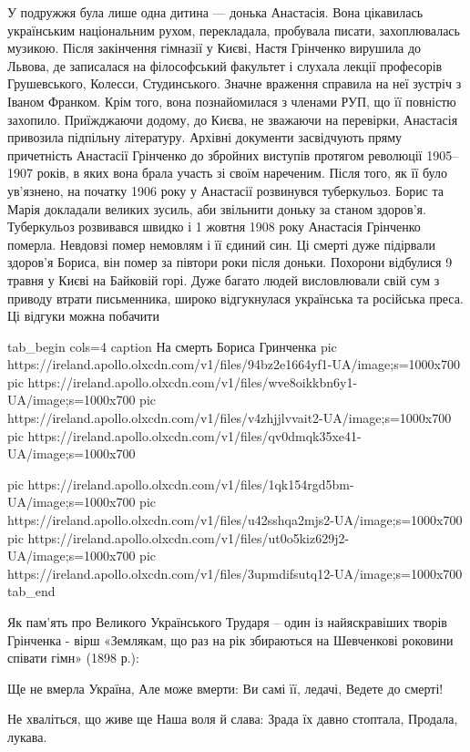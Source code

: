 У подружжя була лише одна дитина — донька Анастасія. Вона цікавилась
українським національним рухом, перекладала, пробувала писати, захоплювалась
музикою. Після закінчення гімназії у Києві, Настя Грінченко вирушила до Львова,
де записалася на філософський факультет і слухала лекції професорів
Грушевського, Колесси, Студинського. Значне враження справила на неї зустріч з
Іваном Франком. Крім того, вона познайомилася з членами РУП, що її повністю
захопило. Приїжджаючи додому, до Києва, не зважаючи на перевірки, Анастасія
привозила підпільну літературу. Архівні документи засвідчують пряму причетність
Анастасії Грінченко до збройних виступів протягом революції 1905–1907 років, в
яких вона брала участь зі своїм нареченим. Після того, як її було ув'язнено, на
початку 1906 року у Анастасії розвинувся туберкульоз. Борис та Марія докладали
великих зусиль, аби звільнити доньку за станом здоров'я. Туберкульоз розвивався
швидко і 1 жовтня 1908 року Анастасія Грінченко померла. Невдовзі помер
немовлям і її єдиний син. Ці смерті дуже підірвали здоров'я Бориса, він помер
за півтори роки після доньки. Похорони відбулися 9 травня у Києві на Байковій
горі. Дуже багато людей висловлювали свій сум з приводу втрати письменника,
широко відгукнулася українська та російська преса. Ці відгуки можна побачити

\ifcmt
tab_begin cols=4
	caption На смерть Бориса Гринченка
pic https://ireland.apollo.olxcdn.com/v1/files/94bz2e1664yf1-UA/image;s=1000x700
pic https://ireland.apollo.olxcdn.com/v1/files/wve8oikkbn6y1-UA/image;s=1000x700
pic https://ireland.apollo.olxcdn.com/v1/files/v4zhjjlvvait2-UA/image;s=1000x700
pic https://ireland.apollo.olxcdn.com/v1/files/qv0dmqk35xe41-UA/image;s=1000x700

pic https://ireland.apollo.olxcdn.com/v1/files/1qk154rgd5bm-UA/image;s=1000x700
pic https://ireland.apollo.olxcdn.com/v1/files/u42sshqa2mjs2-UA/image;s=1000x700
pic https://ireland.apollo.olxcdn.com/v1/files/ut0o5kiz629j2-UA/image;s=1000x700
pic https://ireland.apollo.olxcdn.com/v1/files/3upmdifsutq12-UA/image;s=1000x700
tab_end
\fi

Як пам'ять про Великого Українського Трударя – один із найяскравіших творів
Грінченка -  вірш «Землякам, що раз на рік збираються на Шевченкові роковини
співати гімн» (1898 р.):

Ще не вмерла Україна,
Але може вмерти:
Ви самі її, ледачі,
Ведете до смерті!

Не хваліться, що живе ще
Наша воля й слава:
Зрада їх давно стоптала,
Продала, лукава.

